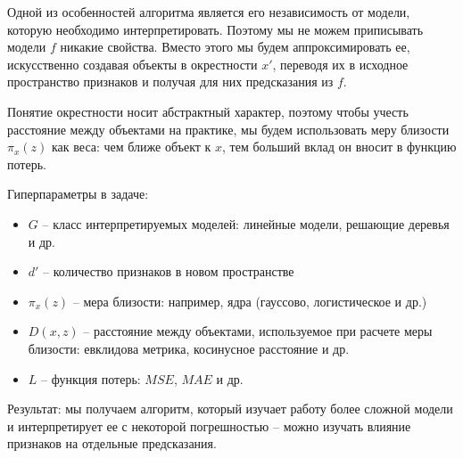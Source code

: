Одной из особенностей алгоритма является его независимость от модели, которую необходимо интерпретировать. Поэтому мы не можем приписывать модели $f$ никакие свойства. Вместо этого мы будем аппроксимировать ее, искусственно создавая объекты в окрестности $x'$, переводя их в исходное пространство признаков и получая для них предсказания из $f$.

Понятие окрестности носит абстрактный характер, поэтому чтобы учесть расстояние между объектами на практике, мы будем использовать меру близости $\pi_x(z)$ как веса: чем ближе объект к $x$, тем больший вклад он вносит в функцию потерь.

Гиперпараметры в задаче:\\[-8mm]
\begin{itemize}
	\item $G$ -- класс интерпретируемых моделей: линейные модели, решающие деревья и др.\\[-6mm]
	\item $d'$ -- количество признаков в новом пространстве
	\item $\pi_x(z)$ -- мера близости: например, ядра (гауссово, логистическое и др.)\\[-6mm]
	\item $D(x,z)$ -- расстояние между объектами, используемое при расчете меры близости: евклидова метрика, косинусное расстояние и др.\\[-6mm]
	\item $L$ -- функция потерь: $MSE$, $MAE$ и др.\\[-6mm]
\end{itemize}


Результат: мы получаем алгоритм, который изучает работу более сложной модели и интерпретирует ее с некоторой погрешностью -- можно изучать влияние признаков на отдельные предсказания.
